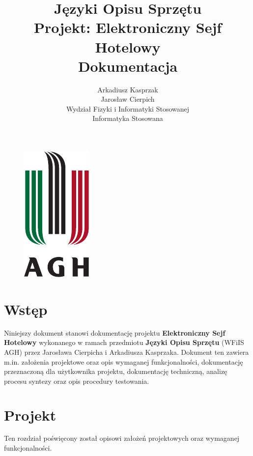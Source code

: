 \documentclass[12pt] {article}
\title {
	Języki Opisu Sprzętu \\
	\large Projekt: Elektroniczny Sejf Hotelowy \\
	Dokumentacja}
\author {
	Arkadiusz Kasprzak \\
	Jarosław Cierpich \\
	Wydział Fizyki i Informatyki Stosowanej \\ 
	Informatyka Stosowana}
\begin{document}
\begin{figure}
\centering
\includegraphics[scale = 1.5]{res/agh_znk_wbr_cmyk}
\end{figure}

\maketitle

\newpage
\tableofcontents

\newpage
\section{Wstęp}
Niniejszy dokument stanowi dokumentację projektu \textbf{Elektroniczny Sejf Hotelowy} wykonanego w ramach przedmiotu \textbf{Języki Opisu Sprzętu} (WFiIS AGH) przez Jarosława Cierpicha i Arkadiusza Kasprzaka. Dokument ten zawiera m.in. założenia projektowe oraz opis wymaganej funkcjonalności, dokumentację przeznaczoną dla użytkownika projektu, dokumentację techniczną, analizę procesu syntezy oraz opis procedury testowania.

\section{Projekt}
Ten rozdział poświęcony został opisowi założeń projektowych oraz wymaganej funkcjonalności.
\end{document}
